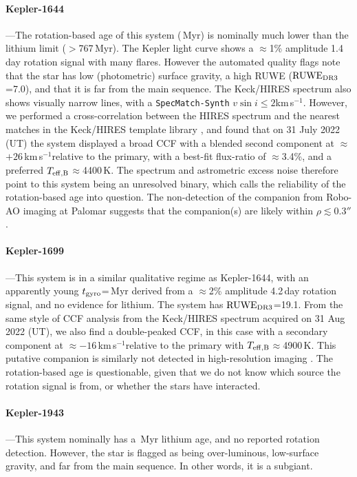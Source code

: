 \documentclass[11pt,twocolumn,tighten]{aastex63}
\newcommand{\kms}{{km\,s$^{-1}$}}
\begin{document}
\paragraph{Kepler-1644}---The rotation-based age of this system
(\kepsixteenfourfour\,Myr) is nominally much lower than the lithium
limit ($>$767\,Myr).  The Kepler light curve shows a $\approx$1\%
amplitude 1.4\,day rotation signal with many flares.  However the
automated quality flags note that the star has low (photometric)
surface gravity, a high RUWE (${\rm RUWE}_{\rm DR3}$=7.0), and that it
is far from the main sequence.  The Keck/HIRES spectrum also shows
visually narrow lines, with a \texttt{SpecMatch-Synth} $v \sin i \leq
2$\kms.  However, we performed a cross-correlation between the HIRES
spectrum and the nearest matches in the Keck/HIRES template library
\citep{2015AJ....149...18K}, and found that on 31 July 2022 (UT) the
system displayed a broad CCF with a blended second component at
$\approx$$+26$\,\kms relative to the primary, with a best-fit
flux-ratio of $\approx$3.4\%, and a preferred $T_{\rm
eff,B}$$\approx$4400\,K.  The spectrum and astrometric excess noise
therefore point to this system being an unresolved binary, which calls
the reliability of the rotation-based age into question.  The
non-detection of the companion from Robo-AO imaging at Palomar
\citep{2017AJ....153...66Z} suggests that the companion(s) are likely
within $\rho$$\lesssim$0.3$''$.



\paragraph{Kepler-1699}---This system is in a similar qualitative
regime as Kepler-1644, with an apparently young $t_{\rm
gyro}$=\kepsixteenninenine\,Myr derived from a $\approx$2\% amplitude
4.2\,day rotation signal, and no evidence for lithium.  The system has
${\rm RUWE}_{\rm DR3}$=19.1.  From the same style of CCF analysis from
the Keck/HIRES spectrum acquired on 31 Aug 2022 (UT), we also find a
double-peaked CCF, in this case with a secondary component at
$\approx$$-16$\,\kms relative to the primary with $T_{\rm
eff,B}$$\approx$4900\,K.  This putative companion is similarly not
detected in high-resolution imaging \citep{2017AJ....153...66Z}.  The
rotation-based age is questionable, given that we do not know which
source the rotation signal is from, or whether the stars have
interacted.

\paragraph{Kepler-1943}---This system nominally has a
\kepnineteenfourthree\,Myr lithium age, and no reported rotation
detection.  However, the star is flagged as being over-luminous,
low-surface gravity, and far from the main sequence.  In other words,
it is a subgiant.
\end{document}
